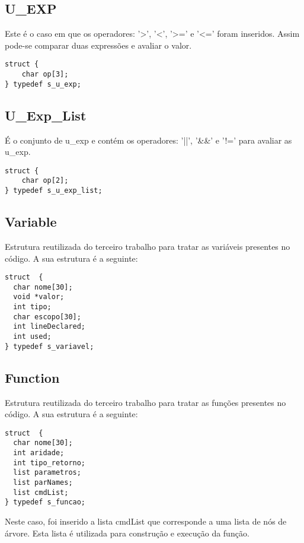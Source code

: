\documentclass[a4paper,10pt]{article}
\begin{document}
\subsection{U\_EXP}

Este é o caso em que os operadores: '>', '<', '>=' e '<=' foram inseridos. Assim pode-se comparar duas expressões e avaliar o valor.

\begin{lstlisting}
struct {
	char op[3];
} typedef s_u_exp;
\end{lstlisting}

\subsection{U\_Exp\_List}

É o conjunto de u\_exp e contém os operadores: '||', '\&\&' e '!=' para avaliar as u\_exp.

\begin{lstlisting}
struct {
	char op[2];
} typedef s_u_exp_list;
\end{lstlisting}

\subsection{Variable}

Estrutura reutilizada do terceiro trabalho para tratar as variáveis presentes no código. A sua estrutura é a seguinte:

\begin{lstlisting}
struct  {
  char nome[30];
  void *valor;
  int tipo;
  char escopo[30];
  int lineDeclared;
  int used;
} typedef s_variavel;
\end{lstlisting}

\subsection{Function}

Estrutura reutilizada do terceiro trabalho para tratar as funções presentes no código. A sua estrutura é a seguinte:

\begin{lstlisting}
struct  {
  char nome[30];
  int aridade;
  int tipo_retorno;
  list parametros;
  list parNames;
  list cmdList;
} typedef s_funcao;
\end{lstlisting}

Neste caso, foi inserido a lista cmdList que corresponde a uma lista de nós de árvore. Esta lista é utilizada para construção e execução da função.
\end{document}
